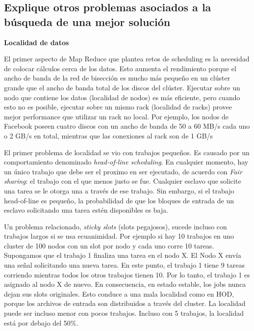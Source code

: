 \subsection{Explique otros problemas asociados a la búsqueda de una mejor solución}

\begin{center}
	\textbf{Localidad de datos}
\end{center}

El primer aspecto de Map Reduce que plantea retos de scheduling es la necesidad de colocar cálculos cerca de los datos. Esto aumenta el rendimiento porque el ancho de banda de la red de bisección es mucho más pequeño en un clúster grande que el ancho de banda total de los discos del clúster. Ejecutar sobre un nodo que contiene los datos (localidad de nodos) es más eficiente, pero cuando esto no es posible, ejecutar sobre un mismo rack (localidad de racks) provee mejor performance que utilizar un rack no local. Por ejemplo, los nodos de Facebook poseen cuatro discos con un ancho de banda de 50 a 60 MB/s cada uno o 2 GB/s en total, mientras que las conexiones al rack son de 1 GB/s
 
El primer problema de localidad se vio con trabajos pequeños. Es causado por un comportamiento denominado \textit{head-of-line scheduling}. En cualquier momento, hay un único trabajo que debe ser el proximo en ser ejecutado, de acuerdo con \textit{Fair sharing}: el trabajo con el que menos justo se fue. Cualquier esclavo que solicite una tarea se le otorga una a través de ese trabajo. Sin embargo, si el trabajo head-of-line es pequeño, la probabilidad de que los bloques de entrada de un esclavo solicitando una tarea estén disponibles es baja.

Un problema relacionado, \textit{sticky slots} (slots pegajosos), sucede incluso con trabajos largos si se usa ecuanimidad. Por ejemplo si hay 10 trabajos en uno cluster de 100 nodos con un slot por nodo y cada uno corre 10 tareas. Supongamos que el trabajo 1 finaliza una tarea en el nodo X. El Nodo X envía una señal solicitando una nueva tarea. En este punto, el trabajo 1 tiene 9 tareas corriendo mientras todos los otros trabajos tienen 10. Por lo tanto, el trabajo 1 es asignado al nodo X de nuevo. En consecuencia, en estado estable, los jobs nunca dejan sus slots originales. Esto conduce a una mala localidad como en HOD, porque los archivos de entrada son distribuidos a través del cluster. La localidad puede ser  incluso menor con pocos trabajos. Incluso con 5 trabajos, la localidad está por debajo del 50\%.\\

